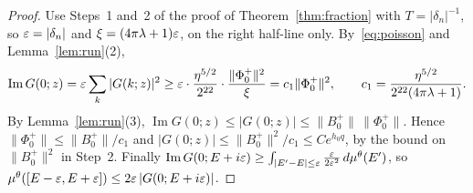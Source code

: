 \begin{proof}
Use Steps~1 and~2 of the proof of Theorem~\ref{thm:fraction} with $T=|\delta_n|^{-1}$, so $\varepsilon=|\delta_n|$ and $\xi=(4\pi\lambda+1)\varepsilon$, on the right half-line only. By~\eqref{eq:poisson} and Lemma~\ref{lem:run}(2),
\[
\operatorname{Im}G(0;z)=\varepsilon\sum_k|G(k;z)|^2\ge\varepsilon\cdot\frac{\eta^{5/2}}{2^{22}}\cdot\frac{\|\Phi_0^+\|^2}{\xi}=c_1\|\Phi_0^+\|^2,\qquad c_1=\frac{\eta^{5/2}}{2^{22}(4\pi\lambda+1)} .
\]
By Lemma~\ref{lem:run}(3), $\operatorname{Im}G(0;z)\le|G(0;z)|\le\|B_0^+\|\,\|\Phi_0^+\|$. Hence $\|\Phi_0^+\|\le\|B_0^+\|/c_1$ and $|G(0;z)|\le\|B_0^+\|^2/c_1\le Ce^{h_0q}$, by the bound on $\|B_0^+\|^2$ in Step~2. Finally $\operatorname{Im}G(0;E+i\varepsilon)\ge\int_{|E'-E|\le\varepsilon}\frac{\varepsilon}{2\varepsilon^2}\,d\mu^\theta(E')$, so $\mu^\theta([E-\varepsilon,E+\varepsilon])\le2\varepsilon\,|G(0;E+i\varepsilon)|$.
\end{proof}

